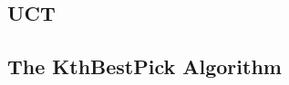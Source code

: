 \documentclass[letterpaper]{article}
\numberwithin{equation}{section}
\numberwithin{theorem}{section}
\numberwithin{lemma}{section}
\numberwithin{df}{section}
\begin{document}


\subsection{UCT}







\subsection{The KthBestPick Algorithm}
\label{sec:KthBestPick}
\end{document}
